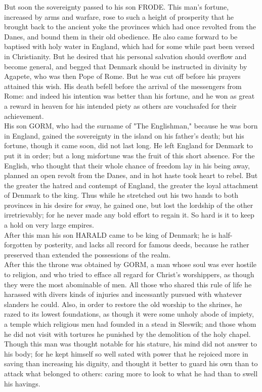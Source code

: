 \documentclass[10pt,a4paper]{report}
\begin{document}
But soon the sovereignty passed to his son FRODE. This man's fortune, increased by arms and warfare, rose to such a height of prosperity that he brought back to the ancient yoke the provinces which had once revolted from the Danes, and bound them in their old obedience. He also came forward to be baptised with holy water in England, which had for some while past been versed in Christianity. But he desired that his personal salvation should overflow and become general, and begged that Denmark should be instructed in divinity by Agapete, who was then Pope of Rome. But he was cut off before his prayers attained this wish. His death befell before the arrival of the messengers from Rome: and indeed his intention was better than his fortune, and he won as great a reward in heaven for his intended piety as others are vouchsafed for their achievement.\\

His son GORM, who had the surname of "The Englishman," because he was born in England, gained the sovereignty in the island on his father's death; but his fortune, though it came soon, did not last long. He left England for Denmark to put it in order; but a long misfortune was the fruit of this short absence. For the English, who thought that their whole chance of freedom lay in his being away, planned an open revolt from the Danes, and in hot haste took heart to rebel. But the greater the hatred and contempt of England, the greater the loyal attachment of Denmark to the king. Thus while he stretched out his two hands to both provinces in his desire for sway, he gained one, but lost the lordship of the other irretrievably; for he never made any bold effort to regain it. So hard is it to keep a hold on very large empires.\\

After this man his son HARALD came to be king of Denmark; he is half-forgotten by posterity, and lacks all record for famous deeds, because he rather preserved than extended the possessions of the realm.\\

After this the throne was obtained by GORM, a man whose soul was ever hostile to religion, and who tried to efface all regard for Christ's worshippers, as though they were the most abominable of men. All those who shared this rule of life he harassed with divers kinds of injuries and incessantly pursued with whatever slanders he could. Also, in order to restore the old worship to the shrines, he razed to its lowest foundations, as though it were some unholy abode of impiety, a temple which religious men had founded in a stead in Sleswik; and those whom he did not visit with tortures he punished by the demolition of the holy chapel. Though this man was thought notable for his stature, his mind did not answer to his body; for he kept himself so well sated with power that he rejoiced more in saving than increasing his dignity, and thought it better to guard his own than to attack what belonged to others: caring more to look to what he had than to swell his havings.\\
\end{document}
